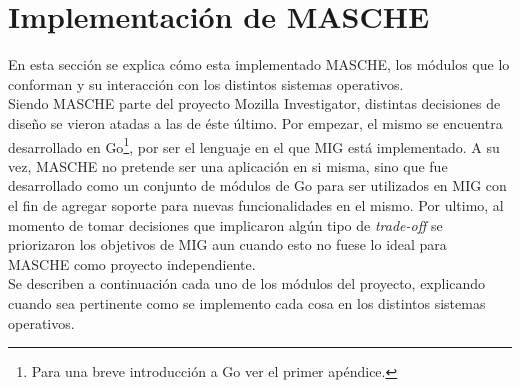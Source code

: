 \section{Implementación de MASCHE}

En esta sección se explica cómo esta implementado MASCHE, los módulos que lo
conforman y su interacción con los distintos sistemas operativos.\\

Siendo MASCHE parte del proyecto Mozilla Investigator, distintas decisiones de
diseño se vieron atadas a las de éste último. Por empezar, el mismo se
encuentra desarrollado en Go\footnote{Para una breve introducción a Go ver el
primer apéndice.}, por ser el lenguaje en el que MIG está implementado. A su
vez, MASCHE no pretende ser una aplicación en si misma, sino que fue
desarrollado como un conjunto de módulos de Go para ser utilizados en MIG con
el fin de agregar soporte para nuevas funcionalidades en el mismo. Por ultimo,
al momento de tomar decisiones que implicaron algún tipo de \textit{trade-off}
se priorizaron los objetivos de MIG aun cuando esto no fuese lo ideal para
MASCHE como proyecto independiente.\\

Se describen a continuación cada uno de los módulos del proyecto, explicando
cuando sea pertinente como se implemento cada cosa en los distintos sistemas
operativos.\\
